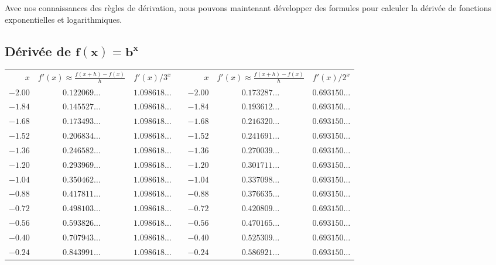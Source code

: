 {Avec nos connaissances des règles de dérivation, nous pouvons maintenant
développer des formules pour calculer la dérivée de fonctions
exponentielles et logarithmiques.

\subsection{Dérivée de $\mathbf{f(x) = b^x}$}\label{SECT_B_EXP}

\begin{table}[t]
{\scriptsize
\begin{center}
\begin{tabular}{r|c|ccr|c|c}
\cline{1-3} \cline{5-7}
\rule[-0.7em]{0ex}{2.5em}
$x$ & $\displaystyle f'(x) \approx \frac{f(x+h)-f(x)}{h}$ & $f'(x)/3^x$ &
\qquad \qquad &
$x$ & $\displaystyle f'(x) \approx \frac{f(x+h)-f(x)}{h}$ & $f'(x)/2^x$
\\[0.8em]
\cline{1-3} \cline{5-7}
$-2.00$ & $0.122069\ldots$ & $1.098618\ldots$ && $-2.00$ & $0.173287\ldots$ & $0.693150\ldots$ \\
$-1.84$ & $0.145527\ldots$ & $1.098618\ldots$ && $-1.84$ & $0.193612\ldots$ & $0.693150\ldots$ \\  
$-1.68$ & $0.173493\ldots$ & $1.098618\ldots$ && $-1.68$ & $0.216320\ldots$ & $0.693150\ldots$ \\ 
$-1.52$ & $0.206834\ldots$ & $1.098618\ldots$ && $-1.52$ & $0.241691\ldots$ & $0.693150\ldots$ \\
$-1.36$ & $0.246582\ldots$ & $1.098618\ldots$ && $-1.36$ & $0.270039\ldots$ & $0.693150\ldots$ \\
$-1.20$ & $0.293969\ldots$ & $1.098618\ldots$ && $-1.20$ & $0.301711\ldots$ & $0.693150\ldots$ \\
$-1.04$ & $0.350462\ldots$ & $1.098618\ldots$ && $-1.04$ & $0.337098\ldots$ & $0.693150\ldots$ \\
$-0.88$ & $0.417811\ldots$ & $1.098618\ldots$ && $-0.88$ & $0.376635\ldots$ & $0.693150\ldots$ \\
$-0.72$ & $0.498103\ldots$ & $1.098618\ldots$ && $-0.72$ & $0.420809\ldots$ & $0.693150\ldots$ \\
$-0.56$ & $0.593826\ldots$ & $1.098618\ldots$ && $-0.56$ & $0.470165\ldots$ & $0.693150\ldots$ \\
$-0.40$ & $0.707943\ldots$ & $1.098618\ldots$ && $-0.40$ & $0.525309\ldots$ & $0.693150\ldots$ \\
$-0.24$ & $0.843991\ldots$ & $1.098618\ldots$ && $-0.24$ & $0.586921\ldots$ & $0.693150\ldots$ \\

\end{tabular}
\end{center}}
\end{table}}
